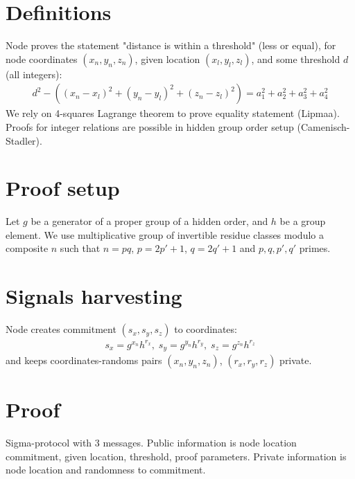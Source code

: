 \documentclass[a4paper,12pt]{article}
\begin{document}
\section{Definitions}
Node proves the statement "distance is within a threshold" (less or equal),
for node coordinates $(x_n, y_n, z_n)$,
given location $(x_l, y_l, z_l)$,
and some threshold $d$ (all integers):
\begin{gather}
\label{eq-distn}
  d^2 - ((x_n - x_l)^2 + (y_n - y_l)^2 + (z_n - z_l)^2) = a_1^2 + a_2^2 + a_3^2 + a_4^2
\end{gather}
We rely on 4-squares Lagrange theorem to prove equality statement (Lipmaa).
Proofs for integer relations are possible in hidden group order setup (Camenisch-Stadler).

\section{Proof setup}

Let $g$ be a generator of a proper group of a hidden order,
and $h$ be a group element.
We use multiplicative group of invertible residue classes modulo a composite $n$ such that
$n=pq$, $p=2p'+1$, $q=2q'+1$ and $p, q, p', q'$ primes.

\section{Signals harvesting}
Node creates commitment $(s_x, s_y, s_z)$ to coordinates:
\begin{gather}
  s_x = g^{x_n} h^{r_x},  \;
  s_y = g^{y_n} h^{r_y},  \;
  s_z = g^{z_n} h^{r_z}
\end{gather}
and keeps coordinates-randoms pairs
$(x_n, y_n, z_n)$, $(r_x, r_y, r_z)$
private.

\section{Proof}
Sigma-protocol with 3 messages.
Public information is node location commitment, given location, threshold, proof parameters.
Private information is node location and randomness to commitment.
\end{document}
